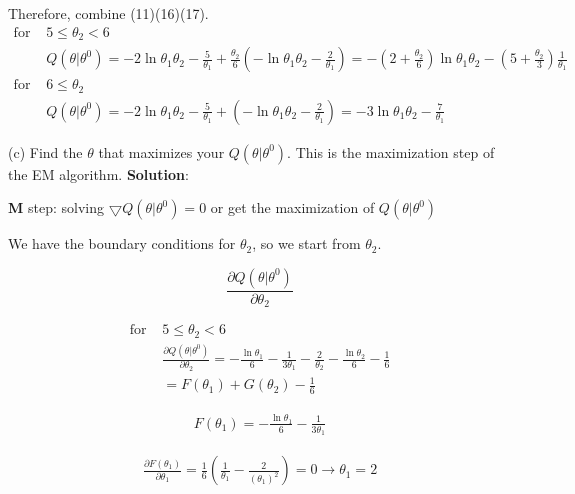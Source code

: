 \documentclass{article}
\begin{document}
Therefore, combine (11)(16)(17).
\begin{equation}
\begin{aligned}
\mbox{for }   & 5 \leq \theta_2 <6 \\
& Q(\theta | \theta^{0})  = -2 \ln{\theta_1 \theta_2} -\frac{5}{\theta_1} + \frac{\theta_2}{6}(-\ln{\theta_1 \theta_2} -\frac{2}{\theta_1})    = -(2+\frac{\theta_2}{6})\ln{\theta_1 \theta_2} -(5+\frac{\theta_2}{3}) \frac{1}{\theta_1} \\
 \mbox{for }   & 6 \leq \theta_2  \\
& Q(\theta | \theta^{0})  = -2 \ln{\theta_1 \theta_2} -\frac{5}{\theta_1} +  (-\ln{\theta_1 \theta_2} -\frac{2}{\theta_1}) 
= -3\ln{\theta_1 \theta_2} -\frac{7}{\theta_1}
\end{aligned}
\end{equation}

(c) Find the $\theta$ that maximizes your  $Q(\theta | \theta^{0})$. This is the maximization step of the EM algorithm.
\newline
\textbf{Solution}:

\textbf{M} step: solving $ \bigtriangledown Q(\theta | \theta^{0})= 0 $ or get the maximization of 
$Q(\theta | \theta^{0})$

We have the boundary conditions for $\theta_2$, so we start from $\theta_2$.

\begin{equation}
    \frac{\partial Q(\theta | \theta^{0})}{ \partial \theta_2 }
\end{equation}

\begin{equation}
\begin{aligned}
\mbox{for }   & 5 \leq \theta_2 <6 \\
& \frac{\partial Q(\theta | \theta^{0})}{ \partial \theta_2 } = -\frac{\ln \theta_1}{6}-\frac{1}{3\theta_1} -\frac{2}{\theta_2}- \frac{\ln \theta_2}{6}  -\frac{1}{6} \\ 
& = F(\theta_1)+G(\theta_2)-\frac{1}{6} 
\end{aligned}
\end{equation}

\begin{equation}
\begin{aligned}
F(\theta_1) = -\frac{\ln \theta_1}{6}-\frac{1}{3\theta_1}
\end{aligned}
\end{equation}

\begin{equation}
\begin{aligned}
\frac{\partial F(\theta_1)}{ \partial \theta_1} = \frac{1}{6} (\frac{1}{\theta_1}-\frac{2}{(\theta_{1})^{2}}) = 0  \rightarrow \theta_1 = 2 
\end{aligned}
\end{equation}
\end{document}
